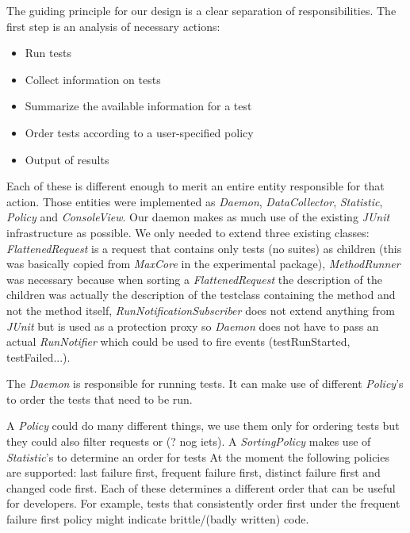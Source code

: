 \documentclass[i2]{oss}
\newcommand{\class}[1]{\emph{#1}}
\newcommand{\junit}{\emph{JUnit }}
\begin{document}
The guiding principle for our design is a clear separation of 
responsibilities. The first step is an analysis of necessary actions:

\begin{itemize}
	\item Run tests
    \item Collect information on tests
    \item Summarize the available information for a test
    \item Order tests according to a user-specified policy
    \item Output of results
\end{itemize}

Each of these is different enough to merit an entire entity responsible 
for that action. Those entities were implemented as \emph{Daemon},
\emph{DataCollector}, \class{Statistic}, \class{Policy} and
\class{ConsoleView}. Our daemon makes as much use of the existing \junit
infrastructure as possible. We only needed to extend three existing
classes: \class{FlattenedRequest} is a request that contains only tests
(no suites) as children (this was basically copied from \class{MaxCore} 
in the experimental package), \class{MethodRunner} was necessary because
when sorting a \class{FlattenedRequest} the description of the children
was actually the description of the testclass containing the method and
not the method itself, \class{RunNotificationSubscriber} does not extend
anything from \junit but is used as a protection proxy so \class{Daemon}
does not have to pass an actual \class{RunNotifier} which could be used
to fire events (testRunStarted, testFailed...).

The \class{Daemon} is responsible for running tests.
It can make use of different \class{Policy}'s to order the tests that 
need to be run.

A \class{Policy} could do many different things, we use them only for
ordering tests but they could also filter requests or (? nog iets).
A \class{SortingPolicy} makes use of \class{Statistic}'s to determine
an order for tests
At the moment the following policies are supported: last failure first, 
frequent failure first, distinct failure first and changed code 
first.
Each of these determines a different order that can be useful for
developers.
For example, tests that consistently order first under the frequent
failure first policy might indicate brittle/(badly written) code.
\end{document}
